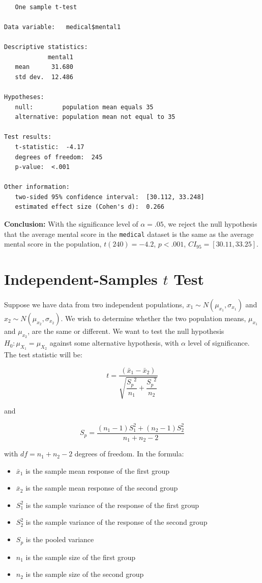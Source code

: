 \documentclass[]{book}
\providecommand{\tightlist}{%
  \setlength{\itemsep}{0pt}\setlength{\parskip}{0pt}}
\begin{document}
\begin{verbatim}

   One sample t-test 

Data variable:   medical$mental1 

Descriptive statistics: 
            mental1
   mean      31.680
   std dev.  12.486

Hypotheses: 
   null:        population mean equals 35 
   alternative: population mean not equal to 35 

Test results: 
   t-statistic:  -4.17 
   degrees of freedom:  245 
   p-value:  <.001 

Other information: 
   two-sided 95% confidence interval:  [30.112, 33.248] 
   estimated effect size (Cohen's d):  0.266 
\end{verbatim}

\textbf{Conclusion:} With the significance level of \(\alpha=.05\), we reject the null hypothesis that the average mental score in the \texttt{medical} dataset is the same as the average mental score in the population, \(t(240)=-4.2\), \(p < .001\), \(CI_{95}=[30.11, 33.25]\).

\hypertarget{independent-samples-t-test}{%
\section{\texorpdfstring{Independent-Samples \(t\) Test}{Independent-Samples t Test}}\label{independent-samples-t-test}}

Suppose we have data from two independent populations, \(x_1 \sim N(\mu_{x_1}, \sigma_{x_1})\) and \(x_2 \sim N(\mu_{x_2}, \sigma_{x_2})\). We wish to determine whether the two population means, \(\mu_{x_1}\) and \(\mu_{x_2}\), are the same or different. We want to test the null hypothesis \(H_0: \mu_{X_1} = \mu_{X_2}\) against some alternative hypothesis, with \(\alpha\) level of significance. The test statistic will be:

\[t =\dfrac{ (\bar{x}_1 - \bar{x}_2)}{ \sqrt{\dfrac{{S_p}^2}{n_1} + \dfrac{{S_p}^2}{n_2}}  }\]

and

\[S_p = \frac{(n_1-1)S_1^2 + (n_2-1)S_2^2}{n_1+n_2-2}\]

with \(df = n_1 + n_2 - 2\) degrees of freedom. In the formula:

\begin{itemize}
\tightlist
\item
  \(\bar{x}_1\) is the sample mean response of the first group
\item
  \(\bar{x}_2\) is the sample mean response of the second group
\item
  \(S_1^2\) is the sample variance of the response of the first group
\item
  \(S_2^2\) is the sample variance of the response of the second group
\item
  \(S_p\) is the pooled variance
\item
  \(n_1\) is the sample size of the first group
\item
  \(n_2\) is the sample size of the second group
\end{itemize}
\end{document}
